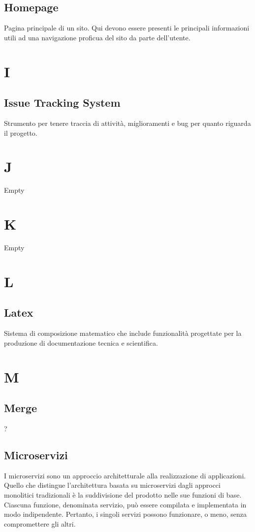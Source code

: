 \subsection*{Homepage}
Pagina principale di un sito. Qui devono essere presenti le principali informazioni utili ad una navigazione proficua del
sito da parte dell'utente.

\section*{I}
\subsection*{Issue Tracking System}
Strumento per tenere traccia di attività, miglioramenti e bug per quanto riguarda il progetto.

\section*{J}
Empty

\section*{K}
Empty

\section*{L}
\subsection*{Latex}
Sistema di composizione matematico che include funzionalità progettate per la produzione di documentazione tecnica e scientifica.

\section*{M}
\subsection*{Merge}
?

\subsection*{Microservizi}
I microservizi sono un approccio architetturale alla realizzazione di applicazioni. 
Quello che distingue l'architettura basata su microservizi dagli approcci monolitici tradizionali 
è la suddivisione del prodotto nelle sue funzioni di base. Ciascuna funzione, denominata servizio, può essere 
compilata e implementata in modo indipendente. Pertanto, i singoli servizi possono funzionare, o meno, senza compromettere gli altri.

